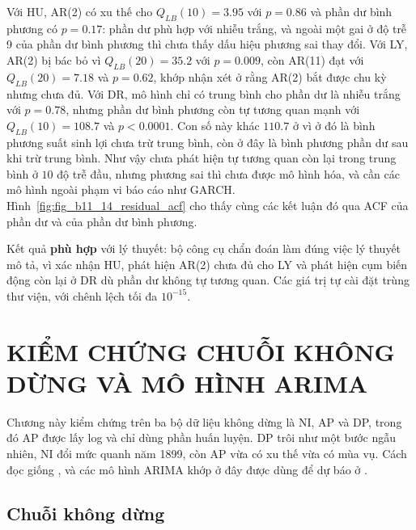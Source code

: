  Với HU, AR(2) có xu thế cho $Q_{LB}(10)=3.95$ với $p=0.86$ và phần dư bình phương có $p=0.17$: phần dư phù hợp với nhiễu trắng, và ngoài một gai ở độ trễ 9 của phần dư bình phương thì chưa thấy dấu hiệu phương sai thay đổi. Với LY, AR(2) bị bác bỏ vì $Q_{LB}(20)=35.2$ với $p=0.009$, còn AR(11) đạt với $Q_{LB}(20)=7.18$ và $p=0.62$, khớp nhận xét ở  rằng AR(2) bắt được chu kỳ nhưng chưa đủ. Với DR, mô hình chỉ có trung bình cho phần dư là nhiễu trắng với $p=0.78$, nhưng phần dư bình phương còn tự tương quan mạnh với $Q_{LB}(10)=108.7$ và $p<0.0001$. Con số này khác $110.7$ ở  vì ở đó là bình phương suất sinh lợi chưa trừ trung bình, còn ở đây là bình phương phần dư sau khi trừ trung bình. Như vậy chưa phát hiện tự tương quan còn lại trong trung bình ở $10$ độ trễ đầu, nhưng phương sai thì chưa được mô hình hóa, và cần các mô hình ngoài phạm vi báo cáo như GARCH. Hình~\ref{fig:fig_b11_14_residual_acf} cho thấy cùng các kết luận đó qua ACF của phần dư và của phần dư bình phương.

 Kết quả \textbf{phù hợp} với lý thuyết: bộ công cụ chẩn đoán làm đúng việc lý thuyết mô tả, vì xác nhận HU, phát hiện AR(2) chưa đủ cho LY và phát hiện cụm biến động còn lại ở DR dù phần dư không tự tương quan. Các giá trị tự cài đặt trùng thư viện, với chênh lệch tối đa $10^{-15}$.
\clearpage
\section[Kiểm chứng chuỗi không dừng và mô hình ARIMA]{KIỂM CHỨNG CHUỖI KHÔNG DỪNG VÀ MÔ HÌNH ARIMA}

Chương này kiểm chứng  trên ba bộ dữ liệu không dừng là NI, AP và DP, trong đó AP được lấy log và chỉ dùng phần huấn luyện. DP trôi như một bước ngẫu nhiên, NI đổi mức quanh năm 1899, còn AP vừa có xu thế vừa có mùa vụ. Cách đọc giống , và các mô hình ARIMA khớp ở đây được dùng để dự báo ở .

\subsection{Chuỗi không dừng}

